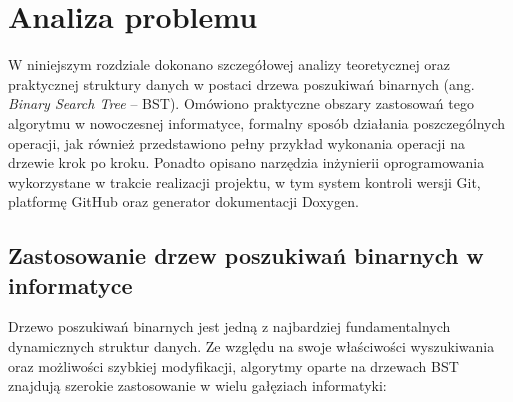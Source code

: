\newpage
\section{Analiza problemu}		%

\hspace{0.60cm}
W niniejszym rozdziale dokonano szczegółowej analizy teoretycznej oraz praktycznej struktury danych w postaci drzewa poszukiwań binarnych (ang. \textit{Binary Search Tree} -- BST). Omówiono praktyczne obszary zastosowań tego algorytmu w nowoczesnej informatyce, formalny sposób działania poszczególnych operacji, jak również przedstawiono pełny przykład wykonania operacji na drzewie krok po kroku. Ponadto opisano narzędzia inżynierii oprogramowania wykorzystane w trakcie realizacji projektu, w tym system kontroli wersji Git, platformę GitHub oraz generator dokumentacji Doxygen.

\subsection{Zastosowanie drzew poszukiwań binarnych w informatyce}

\hspace{0.60cm}
Drzewo poszukiwań binarnych jest jedną z najbardziej fundamentalnych dynamicznych struktur danych. Ze względu na swoje właściwości wyszukiwania oraz możliwości szybkiej modyfikacji, algorytmy oparte na drzewach BST znajdują szerokie zastosowanie w wielu gałęziach informatyki:


